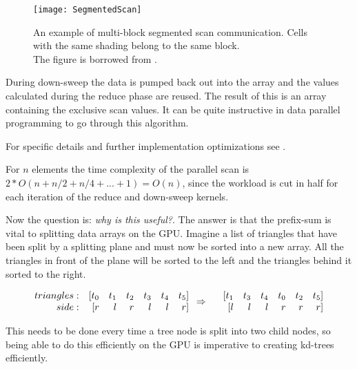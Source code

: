 \begin{figure}
  \centering
  \texttt{[image: SegmentedScan]}

  \parbox{5cm}{\caption[Multi-block segmented scan communication.]{An
      example of multi-block segmented scan communication. Cells with
      the same shading belong to the same block. \\The figure is
      borrowed from .}\label{fig:segScan}}
\end{figure}

During down-sweep the data is pumped back out into the array and the
values calculated during the reduce phase are reused. The result of
this is an array containing the exclusive scan values. It can be quite
instructive in data parallel programming to go through this algorithm.

For specific details and further implementation optimizations see
\sengupta{}.



For $n$ elements the time complexity of the parallel scan is $2 * O(n
+ n/2 + n/4 + ... + 1) = O(n)$, since the workload is cut in half for
each iteration of the reduce and down-sweep kernels.



Now the question is: \textit{why is this useful?}. The answer is that
the prefix-sum is vital to splitting data arrays on the GPU. Imagine a
list of triangles that have been split by a splitting plane and must
now be sorted into a new array. All the triangles in front of the
plane will be sorted to the left and the triangles behind it sorted to
the right.

\begin{displaymath}
  \begin{array} {r r r r r r r}
    triangles: & [t_0 & t_1 & t_2 & t_3 & t_4 & t_5]\\
    side: & [r & l & r & l & l & r]\\
  \end{array}
  \Rightarrow
  \begin{array} {r r r r r r r}
    &[t_1 & t_3 & t_4 & t_0 & t_2 & t_5]\\
    &[l & l & l & r & r & r]\\
  \end{array}
\end{displaymath}

This needs to be done every time a tree node is split into two child nodes, so
being able to do this efficiently on the GPU is imperative to creating kd-trees
efficiently.

